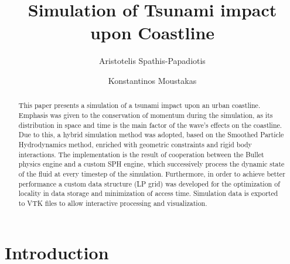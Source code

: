 \documentclass{llncs}
\begin{document}
\title{Simulation of Tsunami impact upon Coastline}


\author{Aristotelis Spathis-Papadiotis \and Konstantinos Moustakas}



\maketitle

\begin{abstract}
  This paper presents a simulation of a tsunami impact upon an urban coastline. Emphasis
  was given to the conservation of momentum during the simulation, as its distribution in
  space and time is the main factor of the wave's effects on the coastline. Due to this, a
  hybrid simulation method was adopted, based on the Smoothed Particle Hydrodynamics
  method, enriched with geometric constraints and rigid body interactions. The
  implementation is the result of cooperation between the Bullet physics engine and a
  custom SPH engine, which successively process the dynamic state of the fluid at every
  timestep of the simulation. Furthermore, in order to achieve better performance a custom
  data structure (LP grid) was developed for the optimization of locality in data storage
  and minimization of access time. Simulation data is exported to VTK files to allow
  interactive processing and visualization. 
\end{abstract}

\section{Introduction}
\end{document}

